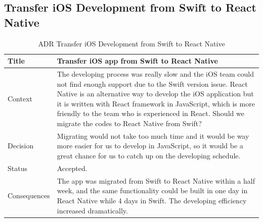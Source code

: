 \documentclass[12pt,a4paper]{article}
\begin{document}
\begin{appendices}
            \subsection{Transfer iOS Development from Swift to React Native}
              \begin{table}[H]
                \centering
                  \begin{tabularx}{\textwidth}{l X}
                    \hline
                    Title & Transfer iOS app from Swift to React Native \\ \hline
                    Context & The developing process was really slow and the iOS team could not find enough support due to the Swift version issue. React Native is an alternative way to develop the iOS application but it is written with React framework in JavaScript, which is more friendly to the team who is experienced in React. Should we migrate the codes to React Native from Swift? \\ 
                    Decision & Migrating would not take too much time and it would be way more easier for us to develop in JavaScript, so it would be a great chance for us to catch up on the developing schedule. \\ 
                    Status & Accepted. \\ 
                    Consequences & The app was migrated from Swift to React Native within a half week, and the same functionality could be built in one day in React Native while 4 days in Swift. The developing efficiency increased dramatically. \\                  
                    \hline
                  \end{tabularx}
                  \caption[Table caption text]{ADR Transfer iOS Development from Swift to React Native}
                  \label{table:ADR Transfer iOS Development from Swift to React Native}
              \end{table}


\end{appendices}
\end{document}
